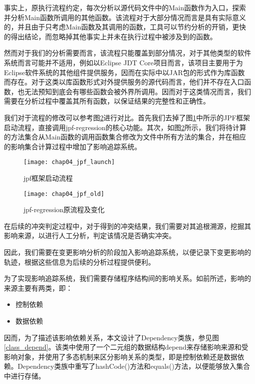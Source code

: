 事实上，原执行流程约定，每次分析以源代码文件中的Main函数作为入口，探索并分析Main函数所调用的其他函数。该流程对于大部分情况而言是具有实际意义的，并且由于只考虑Main函数及其调用的函数，工具可以节约分析的开销，更快的得出结论，而忽略掉其他事实上并未在执行过程中被涉及到的函数。

然而对于我们的分析需要而言，该流程只能覆盖到部分情况，对于其他类型的软件系统而言可能并不适用，例如以Eclipse JDT Core项目而言，该项目主要用于为Eclipse软件系统的其他组件提供服务，因而在实际中以JAR包的形式作为库函数而存在。对于这类以库函数形式对外提供服务的源代码而言，他们并不存在入口函数，也无法预知到底会有哪些函数会被外界所调用。因而对于这类情况而言，我们需要在分析过程中覆盖其所有函数，以保证结果的完整性和正确性。

我们对于流程的修改可以参考图\ref {impact_process_old}进行对比。首先我们去掉了图\ref {impact_process}中所示的JPF框架启动流程，直接调用jpf-regression的核心功能。其次，如图\ref {impact_process_old}所示，我们将待计算的方法集合从Main函数的调用函数集合修改为文件中所有方法的集合，并在相应的影响集合计算过程中增加了影响追踪系统。

\begin{figure}[H]
	\centering
	\texttt{[image: chap04\_jpf\_launch]}
	\caption {jpf框架启动流程}
	\label {impact_process}	
\end{figure}


\begin{figure}
	\centering
	\texttt{[image: chap04\_jpf\_old]}
	\caption {jpf-regression原流程及变化}
	\label {impact_process_old}	
\end{figure}



在后续的冲突判定过程中，对于得到的冲突结果，我们需要对其追根溯源，挖掘其影响来源，以进行人工分析，判定该情况是否确实冲突。

因此，我们需要在变更影响分析的阶段加入影响追踪系统，以便记录下变更影响的轨迹，根据这些信息为后续的分析过程提供便利。

为了实现影响追踪系统，我们需要存储程序结构间的影响关系。如前所述，影响的来源主要有两类，即：
\begin{itemize}
	\item 控制依赖
	\item 数据依赖
\end{itemize}

因而，为了描述该影响依赖关系，本文设计了Dependency类族，参见图\ref {class_depend}。该类中使用了一个二元组的数据结构depend来存储影响来源和受影响对象，并使用了多态机制来区分影响关系的类型，即是控制依赖还是数据依赖。Dependency类族中重写了hashCode()方法和equals()方法，以便能够放入集合中进行存储。

